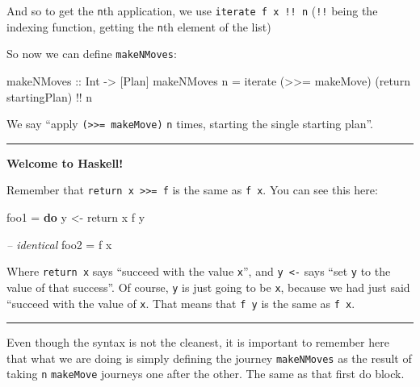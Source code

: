 \documentclass[]{article}
\newenvironment{Shaded}{}{}
\newcommand{\KeywordTok}[1]{\textcolor[rgb]{0.00,0.44,0.13}{\textbf{{#1}}}}
\newcommand{\DataTypeTok}[1]{\textcolor[rgb]{0.56,0.13,0.00}{{#1}}}
\newcommand{\CommentTok}[1]{\textcolor[rgb]{0.38,0.63,0.69}{\textit{{#1}}}}
\newcommand{\OtherTok}[1]{\textcolor[rgb]{0.00,0.44,0.13}{{#1}}}
\newcommand{\FunctionTok}[1]{\textcolor[rgb]{0.02,0.16,0.49}{{#1}}}
\newcommand{\NormalTok}[1]{{#1}}
\begin{document}
And so to get the \texttt{n}th application, we use
\texttt{iterate\ f\ x\ !!\ n} (\texttt{!!} being the indexing function,
getting the \texttt{n}th element of the list)

So now we can define \texttt{makeNMoves}:

\begin{Shaded}
\begin{Highlighting}[]
\OtherTok{makeNMoves ::} \DataTypeTok{Int} \OtherTok{->} \NormalTok{[}\DataTypeTok{Plan}\NormalTok{]}
\NormalTok{makeNMoves n }\FunctionTok{=} \NormalTok{iterate (}\FunctionTok{>>=} \NormalTok{makeMove) (return startingPlan) }\FunctionTok{!!} \NormalTok{n}
\end{Highlighting}
\end{Shaded}

We say ``apply \texttt{(\textgreater{}\textgreater{}=\ makeMove)}
\texttt{n} times, starting the single starting plan''.

\begin{center}\rule{0.5\linewidth}{\linethickness}\end{center}

\textbf{Welcome to Haskell!}

Remember that \texttt{return\ x\ \textgreater{}\textgreater{}=\ f} is
the same as \texttt{f\ x}. You can see this here:

\begin{Shaded}
\begin{Highlighting}[]
\NormalTok{foo1 }\FunctionTok{=} \KeywordTok{do}
    \NormalTok{y }\OtherTok{<-} \NormalTok{return x}
    \NormalTok{f y}

\CommentTok{-- identical}
\NormalTok{foo2 }\FunctionTok{=} \NormalTok{f x}
\end{Highlighting}
\end{Shaded}

Where \texttt{return\ x} says ``succeed with the value \texttt{x}'', and
\texttt{y\ \textless{}-} says ``set \texttt{y} to the value of that
success''. Of course, \texttt{y} is just going to be \texttt{x}, because
we had just said ``succeed with the value of \texttt{x}. That means that
\texttt{f\ y} is the same as \texttt{f\ x}.

\begin{center}\rule{0.5\linewidth}{\linethickness}\end{center}

Even though the syntax is not the cleanest, it is important to remember
here that what we are doing is simply defining the journey
\texttt{makeNMoves} as the result of taking \texttt{n} \texttt{makeMove}
journeys one after the other. The same as that first do block.
\end{document}
